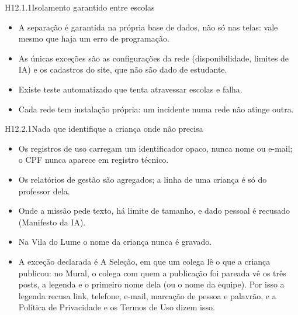 \begin{historia}{H12.1.1}{Isolamento garantido entre escolas}{\pronto}
\aceite
\begin{itemize}
  \item A separação é garantida na própria base de dados, não só nas telas:
    vale mesmo que haja um erro de programação.
  \item As únicas exceções são as configurações da rede (disponibilidade,
    limites de IA) e os cadastros do site, que não são dado de estudante.
  \item Existe teste automatizado que tenta atravessar escolas e falha.
  \item Cada rede tem instalação própria: um incidente numa rede não atinge
    outra.
\end{itemize}
\end{historia}


\begin{historia}{H12.2.1}{Nada que identifique a criança onde não precisa}{\pronto}
\aceite
\begin{itemize}
  \item Os registros de uso carregam um identificador opaco, nunca nome ou
    e-mail; o CPF nunca aparece em registro técnico.
  \item Os relatórios de gestão são agregados; a linha de uma criança é só do
    professor dela.
  \item Onde a missão pede texto, há limite de tamanho, e dado pessoal é
    recusado (Manifesto da IA).
  \item Na Vila do Lume o nome da criança nunca é gravado.
  \item A exceção declarada é A Seleção, em que um colega lê o que a criança
    publicou: no Mural, o colega com quem a publicação foi pareada vê os três
    posts, a legenda e o primeiro nome dela (ou o nome da equipe). Por isso a
    legenda recusa link, telefone, e-mail, marcação de pessoa e palavrão, e a
    Política de Privacidade e os Termos de Uso dizem isso.
\end{itemize}
\end{historia}

